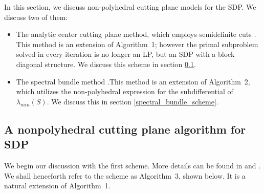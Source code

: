 \documentclass[12pt]{kluwer}
\begin{document}
\begin{article}
\label{nlp_cutting_plane_methods_for_sdp}
In this section, we discuss non-polyhedral cutting plane models for the SDP. 
We discuss two of them:
\begin{itemize}
\item The analytic center cutting plane method, which
employs semidefinite cuts \cite{oskoorouchi_goffin,oskoorouchi}.
This method is an extension of Algorithm~1; however the primal subproblem solved in every iteration is no longer an LP,
but an SDP with a block diagonal structure. We discuss this scheme in section \ref{goffin_oskoorouchi_scheme}.
\item The spectral bundle method \cite{helmberg_rendl,helmberg_hab,helmberg_kiwiel,
helmberg_oustry,oustry}.This method is an extension of Algorithm~2, which utilizes the non-polyhedral expression
for the subdifferential of $\lambda_{min}(S)$. We discuss this in section \ref{spectral_bundle_scheme}.
\end{itemize}

\subsection{A nonpolyhedral cutting plane algorithm for SDP}

\label{goffin_oskoorouchi_scheme}
We begin our discussion with the first scheme. More details can be found in
 and .
We shall henceforth
refer to the scheme as Algorithm~3, shown below.
It is a natural extension of Algorithm~1.


\end{article}
\end{document}
